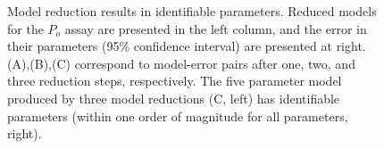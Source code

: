 \documentclass{article}
\newcommand\po{P_o}
\begin{document}
\begin{figure}
\captionsetup{width=1.2\linewidth}
\caption{Model reduction results in identifiable parameters.  Reduced models for the $\po$ assay are presented in the left column, and the error in their parameters (95\% confidence interval) are presented at right.  (A),(B),(C) correspond to model-error pairs after one, two, and three reduction steps, respectively. The five parameter model produced by three model reductions (C, left) has identifiable parameters (within one order of magnitude for all parameters, right).}



\end{figure}

\begin{figure}




%
%
%
%
%
    \hspace{-1.5cm}
	\begin{subfigure}[b]{0.6\linewidth}
	\centering
	\resizebox{\linewidth}{!}{

}
\end{subfigure}
\end{figure}
\end{document}

